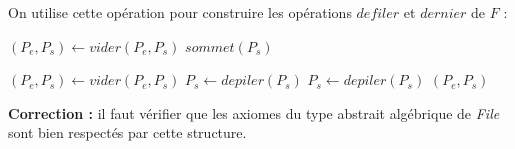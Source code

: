 \documentclass[../main.tex]{subfiles}
\begin{document}
On utilise cette opération pour construire les opérations $defiler$ et $dernier$ de $F$ :

\begin{algorithm}
\caption{$dernier(F)$}\label{alg:dernier}
 {
	$(P_e, P_s) \leftarrow vider(P_e, P_s)$ 
}
\Return $sommet(P_s)$
\end{algorithm}
\begin{algorithm}
\caption{$defiler(F)$}\label{alg:defiler}
 {
	$(P_e, P_s) \leftarrow vider(P_e, P_s)$ 
	$P_s \leftarrow depiler(P_s)$\;
} {
	$P_s \leftarrow depiler(P_s)$\;
}
\Return $(P_e, P_s)$
\end{algorithm}

\textbf{Correction :} il faut vérifier que les axiomes du type abstrait algébrique de \textit{File} sont bien respectés par cette structure.
\end{document}
